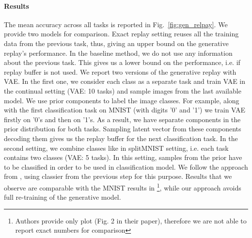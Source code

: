 \paragraph{Results} The mean accuracy across all tasks is reported in Fig.~\ref{fig:gen_relpay}. We provide two models for comparison. Exact replay setting reuses all the training data from the previous task, thus, giving an upper bound on the generative replay's performance. In the baseline method, we do not use any information about the previous task. This gives us a lower bound on the performance, i.e. if replay buffer is not used.
We report two versions of the generative replay with VAE. In the first one, we consider each class as a separate task and train VAE in the continual setting (VAE: 10 tasks) and sample images from the last available model. We use prior components to label the image classes. For example, along with the first classification task on MNIST (with digits '0' and '1') we train VAE  firstly on '0's and then on '1's. As a result, we have separate components in the prior distribution for both tasks. Sampling latent vector from these components decoding them gives us the replay buffer for the next classification task. 
In the second setting, we combine classes like in splitMNIST setting, i.e. each task contains two classes (VAE: 5 tasks). In this setting, samples from the prior have to be classified in order to be used in classification model. We follow the approach from \cite{shin2017continual}, using classier from the previous step for this purpose.
Results that we observe are comparable with the MNIST results in \cite{shin2017continual}\footnote{Authors provide only plot (Fig. 2 in their paper), therefore we are not able to report exact numbers for comparison}, while our approach avoids full re-training of the generative model.
